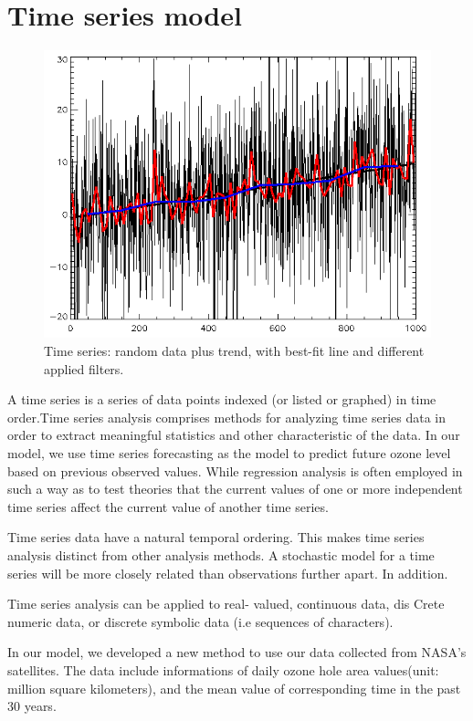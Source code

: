 \documentclass[12pt]{article}
\begin{document}
\section{Time series model}
\begin{center}
\begin{figure}[htpb]
\centering
\includegraphics[scale=0.35]{ts_model}
\caption{Time series: random data plus trend, with best-fit line and different applied filters.}\label{fig:ts_exam}
\end{figure}
\end{center}
A time series is a series of data points indexed (or listed or graphed) in time order.Time series analysis comprises methods for analyzing time series data in order to extract meaningful statistics and other characteristic of the data. In our model, we use time series forecasting as the model to predict future ozone level based on previous observed values. While regression analysis is often employed in such a way as to test theories that the current values of one or more independent time series affect the current value of another time series.\cite{temis.nl}

Time series data have a natural temporal ordering. This makes time series analysis distinct from other analysis methods.  A stochastic model for a time series will be more closely related than observations further apart. In addition. 

Time series analysis can be applied to real- valued, continuous data, dis Crete numeric data, or discrete symbolic data (i.e sequences of characters).

In our model, we developed a new method to use our data collected from NASA's satellites. The data include informations of daily ozone hole area values(unit: million square  kilometers), and the mean value of corresponding time in the past 30 years.
\end{document}
